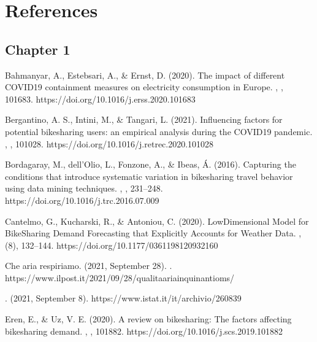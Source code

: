 \documentclass[letterpaper,10pt,english]{jupyterBook}
\begin{document}
\chapter{References}
\label{\detokenize{references:references}}\label{\detokenize{references::doc}}

\section{Chapter 1}
\label{\detokenize{references:chapter-1}}
\sphinxAtStartPar
Bahmanyar, A., Estebsari, A., \& Ernst, D. (2020). The impact of different COVID\sphinxhyphen{}19 containment measures on electricity consumption in Europe. , , 101683. https://doi.org/10.1016/j.erss.2020.101683

\sphinxAtStartPar
Bergantino, A. S., Intini, M., \& Tangari, L. (2021). Influencing factors for potential bike\sphinxhyphen{}sharing users: an empirical analysis during the COVID\sphinxhyphen{}19 pandemic. , , 101028. https://doi.org/10.1016/j.retrec.2020.101028

\sphinxAtStartPar
Bordagaray, M., dell’Olio, L., Fonzone, A., \& Ibeas, Á. (2016). Capturing the conditions that introduce systematic variation in bike\sphinxhyphen{}sharing travel behavior using data mining techniques. , , 231–248. https://doi.org/10.1016/j.trc.2016.07.009

\sphinxAtStartPar
Cantelmo, G., Kucharski, R., \& Antoniou, C. (2020). Low\sphinxhyphen{}Dimensional Model for Bike\sphinxhyphen{}Sharing Demand Forecasting that Explicitly Accounts for Weather Data. , (8), 132–144. https://doi.org/10.1177/0361198120932160

\sphinxAtStartPar
Che aria respiriamo. (2021, September 28). . https://www.ilpost.it/2021/09/28/qualita\sphinxhyphen{}aria\sphinxhyphen{}inquinanti\sphinxhyphen{}oms/

\sphinxAtStartPar
{}. (2021, September 8). https://www.istat.it/it/archivio/260839

\sphinxAtStartPar
Eren, E., \& Uz, V. E. (2020). A review on bike\sphinxhyphen{}sharing: The factors affecting bike\sphinxhyphen{}sharing demand. , , 101882. https://doi.org/10.1016/j.scs.2019.101882
\end{document}
